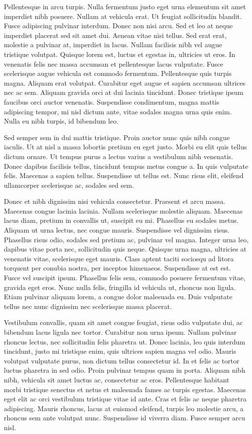 Pellentesque in arcu turpis. Nulla fermentum justo eget urna elementum sit amet imperdiet nibh posuere. Nullam at vehicula erat. Ut feugiat sollicitudin blandit. Fusce adipiscing pulvinar interdum. Donec non nisi arcu. Sed et leo at neque imperdiet placerat sed sit amet dui. Aenean vitae nisi tellus. Sed erat erat, molestie a pulvinar at, imperdiet in lacus. Nullam facilisis nibh vel augue tristique volutpat. Quisque lorem est, luctus et egestas in, ultricies ut eros. In venenatis felis nec massa accumsan et pellentesque lacus vulputate. Fusce scelerisque augue vehicula est commodo fermentum. Pellentesque quis turpis magna. Aliquam erat volutpat. Curabitur eget augue et sapien accumsan ultrices nec ac sem. Aliquam gravida orci at dui lacinia tincidunt. Donec tristique ipsum faucibus orci auctor venenatis. Suspendisse condimentum, magna mattis adipiscing tempor, mi nisl dictum ante, vitae sodales magna urna quis enim. Nulla eu nibh turpis, id bibendum leo.

Sed semper sem in dui mattis tristique. Proin auctor nunc quis nibh congue iaculis. Ut at nisl a massa lobortis pretium eu eget justo. Morbi eu elit quis tellus dictum ornare. Ut tempus purus a lectus varius a vestibulum nibh venenatis. Donec dapibus facilisis tellus, tincidunt tempus metus congue a. In quis vulputate felis. Maecenas a sapien tellus. Suspendisse ut tellus est. Nunc risus elit, eleifend ullamcorper scelerisque ac, sodales sed sem.

Donec et nibh dignissim nisi vehicula consectetur. Praesent et arcu massa. Maecenas congue lacinia lacinia. Nullam scelerisque molestie aliquam. Maecenas lacus diam, pretium in convallis ut, suscipit eu mi. Phasellus eu sodales metus. Aliquam ut urna lectus, nec congue mauris. Suspendisse vel dignissim risus. Phasellus risus odio, sodales sed pretium ac, pulvinar vel magna. Integer urna leo, dapibus vitae porta nec, sollicitudin quis neque. Quisque urna magna, ultricies at venenatis vitae, scelerisque eget mauris. Class aptent taciti sociosqu ad litora torquent per conubia nostra, per inceptos himenaeos. Suspendisse at est est. Fusce vel suscipit ipsum. Phasellus felis sem, commodo posuere fermentum vitae, gravida eget eros. Nunc nulla felis, fringilla id vehicula ut, rhoncus non ligula. Etiam pulvinar aliquam lorem, a congue dolor malesuada eu. Duis vulputate tellus nec nunc dignissim nec scelerisque massa placerat.

Vestibulum convallis, quam sit amet congue feugiat, risus odio vulputate dui, ac bibendum lacus ligula nec tortor. Curabitur non urna ipsum. Nullam pulvinar rhoncus lectus, nec sollicitudin felis pharetra ut. Donec lacinia, leo quis interdum tincidunt, justo mi tristique enim, quis ultrices sapien magna vel odio. Mauris volutpat vulputate purus, non dictum tellus consectetur id. In et felis ac tortor luctus pharetra in sed odio. Proin pulvinar tempus quam in porta. Aliquam nibh nibh, vehicula sit amet luctus ac, consectetur ac eros. Pellentesque habitant morbi tristique senectus et netus et malesuada fames ac turpis egestas. Maecenas eget elit ac orci vestibulum tristique vitae id ante. Cras et felis ac neque pharetra adipiscing. Mauris rhoncus, lacus at euismod eleifend, turpis leo molestie arcu, a rhoncus sem ante volutpat nunc. Suspendisse id viverra diam. Fusce semper arcu nisl.